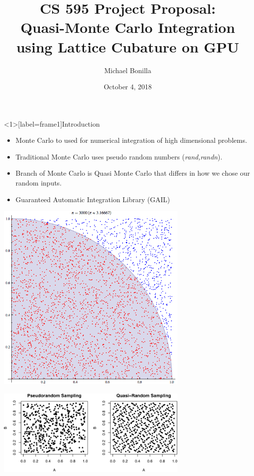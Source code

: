\documentclass[11pt]{beamer}
\author{Michael Bonilla}
\title{CS 595 Project Proposal: \\ Quasi-Monte Carlo Integration using
Lattice Cubature on GPU}
\date{October 4, 2018}
\begin{document}
\nocite{*}
\begin{frame}
\titlepage
\end{frame}


\begin{frame}<1>[label=frame1]{Introduction}
\begin{itemize}
\item Monte Carlo to used for numerical integration of high dimensional problems.
\item Traditional Monte Carlo uses pseudo random numbers (\textit{rand,randn}).
\item Branch of Monte Carlo is Quasi Monte Carlo that differs in how we chose our random inputs.
\item Guaranteed Automatic Integration Library (GAIL)
\end{itemize}
\end{frame}

\begin{frame}
\centering
\includegraphics[width=0.7\textwidth]{mc.png} 
\end{frame}


\begin{frame}
\centering
\includegraphics[width=0.7\textwidth]{pvsq.png} 
\end{frame}
\end{document}
